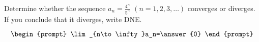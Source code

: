 \documentclass{ximera}
\author{Gregory Hartman \and Matthew Carr}
\begin{document}
\begin{exercise}



Determine whether the sequence $a_n=\frac{4^n}{5^n}$ $(n=1,2,3,\ldots)$ converges or diverges. If you conclude that it diverges, write DNE.

\[
\begin{prompt}
\lim_{n\to\infty}a_n=\answer{0}
\end{prompt}
\]


\end{exercise}
\end{document}
